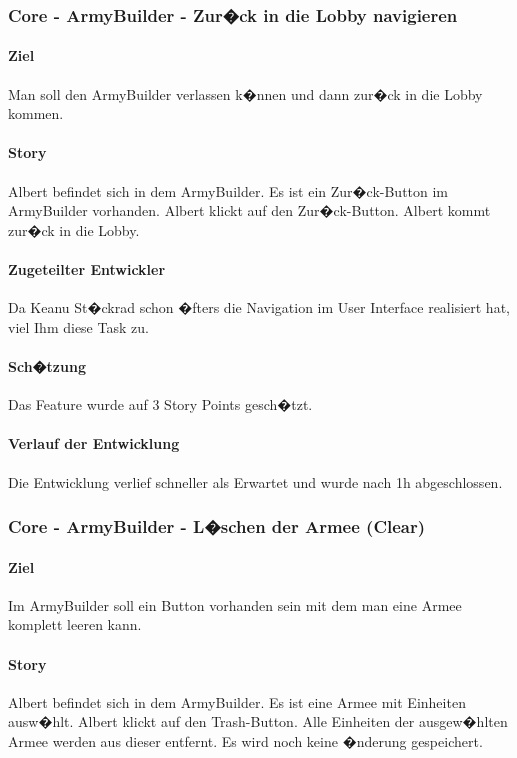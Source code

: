 \documentclass[12pt, titlepage]{scrartcl}
\begin{document}
		\subsubsection{Core - ArmyBuilder - Zur�ck in die Lobby navigieren}
		\paragraph{Ziel} Man soll den ArmyBuilder verlassen k�nnen und dann zur�ck in die Lobby kommen.
		\paragraph{Story} Albert befindet sich in dem ArmyBuilder. Es ist ein \glqq Zur�ck\grqq-Button im ArmyBuilder vorhanden. Albert klickt auf den \glqq Zur�ck\grqq-Button. Albert kommt zur�ck in die Lobby.
		\paragraph{Zugeteilter Entwickler} Da Keanu St�ckrad schon �fters die Navigation im User Interface realisiert hat, viel Ihm diese Task zu.
		\paragraph{Sch�tzung}
		Das Feature wurde auf 3 Story Points gesch�tzt.
		\paragraph{Verlauf der Entwicklung} 
		Die Entwicklung verlief schneller als Erwartet und wurde nach 1h abgeschlossen.
		
		\subsubsection{Core - ArmyBuilder - L�schen der Armee (Clear)}
		\paragraph{Ziel} Im ArmyBuilder soll ein Button vorhanden sein mit dem man eine Armee komplett leeren kann.
		\paragraph{Story}Albert befindet sich in dem ArmyBuilder. Es ist eine Armee mit Einheiten ausw�hlt. Albert klickt auf den \glqq Trash-Button\grqq. Alle Einheiten der ausgew�hlten Armee werden aus dieser entfernt. Es wird noch keine �nderung gespeichert.
\end{document}
